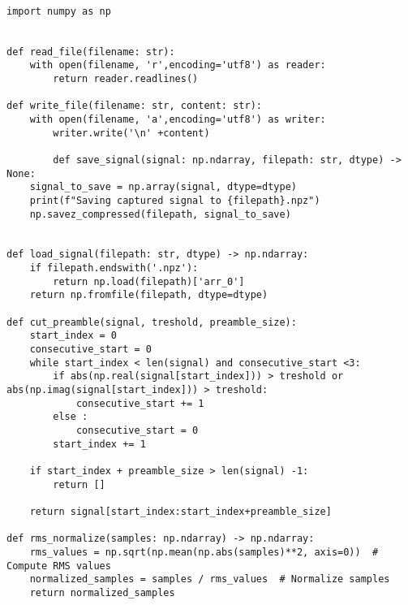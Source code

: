 \begin{lstlisting}[style=pythonstyle, caption={Preprocessing}, label={lst:python}]

import numpy as np


def read_file(filename: str):
    with open(filename, 'r',encoding='utf8') as reader:
        return reader.readlines()

def write_file(filename: str, content: str):
    with open(filename, 'a',encoding='utf8') as writer:
        writer.write('\n' +content)
        
        def save_signal(signal: np.ndarray, filepath: str, dtype) -> None:
    signal_to_save = np.array(signal, dtype=dtype)
    print(f"Saving captured signal to {filepath}.npz")
    np.savez_compressed(filepath, signal_to_save)


def load_signal(filepath: str, dtype) -> np.ndarray:
    if filepath.endswith('.npz'):
        return np.load(filepath)['arr_0']
    return np.fromfile(filepath, dtype=dtype)
    
def cut_preamble(signal, treshold, preamble_size):
    start_index = 0
    consecutive_start = 0
    while start_index < len(signal) and consecutive_start <3:
        if abs(np.real(signal[start_index])) > treshold or abs(np.imag(signal[start_index])) > treshold:
            consecutive_start += 1
        else :
            consecutive_start = 0
        start_index += 1

    if start_index + preamble_size > len(signal) -1:
        return []

    return signal[start_index:start_index+preamble_size]

def rms_normalize(samples: np.ndarray) -> np.ndarray:
    rms_values = np.sqrt(np.mean(np.abs(samples)**2, axis=0))  # Compute RMS values
    normalized_samples = samples / rms_values  # Normalize samples
    return normalized_samples
\end{lstlisting}